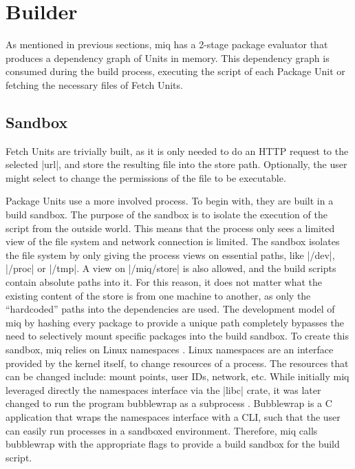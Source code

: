 \section{Builder}
\label{sec:builder}
As mentioned in previous sections, miq has a 2-stage package
evaluator that produces a dependency graph of Units in
memory. This dependency graph is consumed during the build
process, executing the script of each Package Unit or
fetching the necessary files of Fetch Units.

\subsection{Sandbox}

Fetch Units are trivially built, as it is only needed to do
an HTTP request to the selected |url|, and store the
resulting file into the store path. Optionally, the user
might select to change the permissions of the file to be executable.

Package Units use a more involved process. To begin with,
they are built in a build sandbox. The purpose of the
sandbox is to isolate the execution of the script from the
outside world. This means that the process only sees a
limited view of the file system and network connection is
limited. The sandbox isolates the file system by only giving
the process views on essential paths, like |/dev|, |/proc|
or |/tmp|. A view on |/miq/store| is also allowed, and the
build scripts contain absolute paths into it. For this
reason, it does not matter what the existing content of the
store is from one machine to another, as only the
``hardcoded'' paths into the dependencies are used. The
development model of miq by hashing every package to provide
a unique path completely bypasses the need to selectively
mount specific packages into the build sandbox. To create
this sandbox, miq relies on Linux namespaces
\cite{NamespacesLinuxManualb} . Linux namespaces are an
interface provided by the kernel itself, to change
resources of a process. The resources that can be changed
include: mount points, user IDs, network, etc. While
initially miq leveraged directly the namespaces interface
via the |libc| crate, it was later changed to run the
program bubblewrap as a subprocess . Bubblewrap \cite{Bubblewrap2023} is a C
application that wraps the namespaces interface with a
\ac{CLI}, such that the user can easily run processes in a
sandboxed environment. Therefore, miq calls bubblewrap with
the appropriate flags to provide a build sandbox for the
build script.

